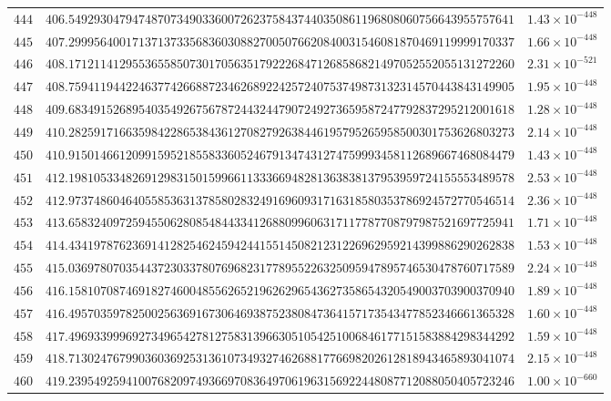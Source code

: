 \documentclass[12pt,reqno]{amsart}
\theoremstyle{remark}
\begin{document}
\begin{longtable}{clc}
$444$ & $406.5492930479474870734903360072623758437440350861196808060756643955757641$ & $1.43\times 10^{-448}$ \\
$445$ & $407.2999564001713713733568360308827005076620840031546081870469119999170337$ & $1.66\times 10^{-448}$ \\
$446$ & $408.1712114129553655850730170563517922268471268586821497052552055131272260$ & $2.31\times 10^{-521}$ \\
$447$ & $408.7594119442246377426688723462689224257240753749873132314570443843149905$ & $1.95\times 10^{-448}$ \\
$448$ & $409.6834915268954035492675678724432447907249273659587247792837295212001618$ & $1.28\times 10^{-448}$ \\
$449$ & $410.2825917166359842286538436127082792638446195795265958500301753626803273$ & $2.14\times 10^{-448}$ \\
$450$ & $410.9150146612099159521855833605246791347431274759993458112689667468084479$ & $1.43\times 10^{-448}$ \\
$451$ & $412.1981053348269129831501599661133366948281363838137953959724155553489578$ & $2.53\times 10^{-448}$ \\
$452$ & $412.9737486046405585363137858028324916960931716318580353786924572770546514$ & $2.36\times 10^{-448}$ \\
$453$ & $413.6583240972594550628085484433412688099606317117787708797987521697725941$ & $1.71\times 10^{-448}$ \\
$454$ & $414.4341978762369141282546245942441551450821231226962959214399886290262838$ & $1.53\times 10^{-448}$ \\
$455$ & $415.0369780703544372303378076968231778955226325095947895746530478760717589$ & $2.24\times 10^{-448}$ \\
$456$ & $416.1581070874691827460048556265219626296543627358654320549003703900370940$ & $1.89\times 10^{-448}$ \\
$457$ & $416.4957035978250025636916730646938752380847364157173543477852346661365328$ & $1.60\times 10^{-448}$ \\
$458$ & $417.4969339996927349654278127583139663051054251006846177151583884298344292$ & $1.59\times 10^{-448}$ \\
$459$ & $418.7130247679903603692531361073493274626881776698202612818943465893041074$ & $2.15\times 10^{-448}$ \\
$460$ & $419.2395492594100768209749366970836497061963156922448087712088050405723246$ & $1.00\times 10^{-660}$ \\

\end{longtable}
\end{document}
